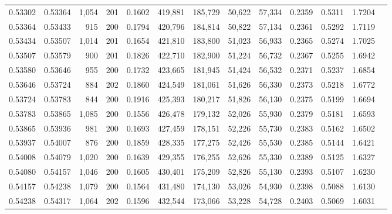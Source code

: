 \begin{tabular}{rrrrrrrrrrrrr}
0.53302 & 0.53364 & 1,054 & 201 &                                     0.1602 & 419,881 & 185,729 &  50,622 &  57,334 & 0.2359 & 0.5311 & 1.7204 \\
0.53364 & 0.53433 &   915 & 200 &                                     0.1794 & 420,796 & 184,814 &  50,822 &  57,134 & 0.2361 & 0.5292 & 1.7119 \\
0.53434 & 0.53507 & 1,014 & 201 &                                     0.1654 & 421,810 & 183,800 &  51,023 &  56,933 & 0.2365 & 0.5274 & 1.7025 \\
0.53507 & 0.53579 &   900 & 201 &                                     0.1826 & 422,710 & 182,900 &  51,224 &  56,732 & 0.2367 & 0.5255 & 1.6942 \\
0.53580 & 0.53646 &   955 & 200 &                                     0.1732 & 423,665 & 181,945 &  51,424 &  56,532 & 0.2371 & 0.5237 & 1.6854 \\
0.53646 & 0.53724 &   884 & 202 &                                     0.1860 & 424,549 & 181,061 &  51,626 &  56,330 & 0.2373 & 0.5218 & 1.6772 \\
0.53724 & 0.53783 &   844 & 200 &                                     0.1916 & 425,393 & 180,217 &  51,826 &  56,130 & 0.2375 & 0.5199 & 1.6694 \\
0.53783 & 0.53865 & 1,085 & 200 &                                     0.1556 & 426,478 & 179,132 &  52,026 &  55,930 & 0.2379 & 0.5181 & 1.6593 \\
0.53865 & 0.53936 &   981 & 200 &                                     0.1693 & 427,459 & 178,151 &  52,226 &  55,730 & 0.2383 & 0.5162 & 1.6502 \\
0.53937 & 0.54007 &   876 & 200 &                                     0.1859 & 428,335 & 177,275 &  52,426 &  55,530 & 0.2385 & 0.5144 & 1.6421 \\
0.54008 & 0.54079 & 1,020 & 200 &                                     0.1639 & 429,355 & 176,255 &  52,626 &  55,330 & 0.2389 & 0.5125 & 1.6327 \\
0.54080 & 0.54157 & 1,046 & 200 &                                     0.1605 & 430,401 & 175,209 &  52,826 &  55,130 & 0.2393 & 0.5107 & 1.6230 \\
0.54157 & 0.54238 & 1,079 & 200 &                                     0.1564 & 431,480 & 174,130 &  53,026 &  54,930 & 0.2398 & 0.5088 & 1.6130 \\
0.54238 & 0.54317 & 1,064 & 202 &                                     0.1596 & 432,544 & 173,066 &  53,228 &  54,728 & 0.2403 & 0.5069 & 1.6031 \\

\end{tabular}
